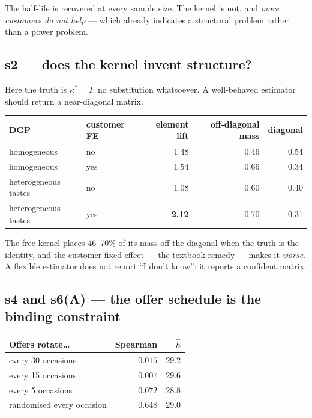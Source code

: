 \documentclass[11pt]{article}
\begin{document}
\noindent The half-life is recovered at every sample size. The kernel is not,
and \emph{more customers do not help} --- which already indicates a structural
problem rather than a power problem.

\subsection{s2 --- does the kernel invent structure?}

Here the truth is $\kappa^{*} = I$: no substitution whatsoever. A well-behaved
estimator should return a near-diagonal matrix.

\begin{center}\small
\begin{tabular}{llrrr}
\toprule
DGP & customer FE & element lift & off-diagonal mass & diagonal \\
\midrule
homogeneous & no & 1.48 & 0.46 & 0.54 \\
homogeneous & yes & 1.54 & 0.66 & 0.34 \\
heterogeneous tastes & no & 1.08 & 0.60 & 0.40 \\
heterogeneous tastes & yes & \textbf{2.12} & 0.70 & 0.31 \\
\bottomrule
\end{tabular}
\end{center}

\noindent The free kernel places 46--70\% of its mass off the diagonal when the
truth is the identity, and the customer fixed effect --- the textbook remedy ---
makes it \emph{worse}. A flexible estimator does not report ``I don't know''; it
reports a confident matrix.

\subsection{s4 and s6(A) --- the offer schedule is the binding constraint}

\begin{center}\small
\begin{tabular}{lrr}
\toprule
Offers rotate\dots & Spearman & $\hat h$ \\
\midrule
every 30 occasions & $-0.015$ & 29.2 \\
every 15 occasions & $0.007$ & 29.6 \\
every 5 occasions & $0.072$ & 28.8 \\
randomised every occasion & $\mathbf{0.648}$ & 29.0 \\
\bottomrule
\end{tabular}
\end{center}
\end{document}
